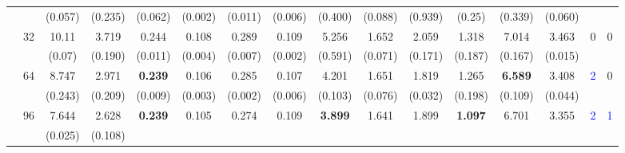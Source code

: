 \begin{table}[ht]
{\begin{tabular}{ll|cc|cc|cc|cc|cc|cc||cc}
                      {} & {} &
                      \small{(0.057)} & 
                      \small{(0.235)} & 
                      \small{(0.062)} & 
                      \small{(0.002)} & 
                      \small{(0.011)} & 
                      \small{(0.006)} & 
                      \small{(0.400)} & 
                      \small{(0.088)} &
                      \small{(0.939)} & 
                      \small{(0.25)} &
                      \small{(0.339)} & 
                      \small{(0.060)} \\
\cline{2-16}
{} & \multirow{2}{*}{32} & 10.11 & 3.719 & 0.244 & 0.108 & 0.289 & 0.109 & 5.256 & 1.652 & 2.059 & 1.318 & 7.014 & 3.463 & \multirow{2}{*}{\small{0}} & \multirow{2}{*}{\small{0}} \\
                      {} & {} &
                      \small{(0.07)} & 
                      \small{(0.190)} & 
                      \small{(0.011)} & 
                      \small{(0.004)} & 
                      \small{(0.007)} & 
                      \small{(0.002)} & 
                      \small{(0.591)} & 
                      \small{(0.071)} &
                      \small{(0.171)} & 
                      \small{(0.187)} &
                      \small{(0.167)} & 
                      \small{(0.015)} \\
\cline{2-16}
{} & \multirow{2}{*}{64} & 8.747 & 2.971 & \textbf{0.239 }& 0.106 & 0.285 & 0.107 & 4.201 & 1.651 & 1.819 & 1.265 & \textbf{6.589} & 3.408 & \multirow{2}{*}{\small{\textcolor{blue}{2}}} & \multirow{2}{*}{\small{0}} \\
                      {} & {} &
                      \small{(0.243)} & 
                      \small{(0.209)} & 
                      \small{(0.009)} & 
                      \small{(0.003)} & 
                      \small{(0.002)} & 
                      \small{(0.006)} & 
                      \small{(0.103)} & 
                      \small{(0.076)} &
                      \small{(0.032)} & 
                      \small{(0.198)} &
                      \small{(0.109)} & 
                      \small{(0.044)} \\
\cline{2-16}
{} & \multirow{2}{*}{96} & 7.644 & 2.628 & \textbf{0.239} & 0.105 & 0.274 & 0.109 & \textbf{3.899} & 1.641 & 1.899 & \textbf{1.097} & 6.701 & 3.355 & \multirow{2}{*}{\small{\textcolor{blue}{2}}} & \multirow{2}{*}{\small{\textcolor{blue}{1}}} \\
                      {} & {} &
                      \small{(0.025)} & 
                      \small{(0.108)} & 

\end{tabular}}
\end{table}
